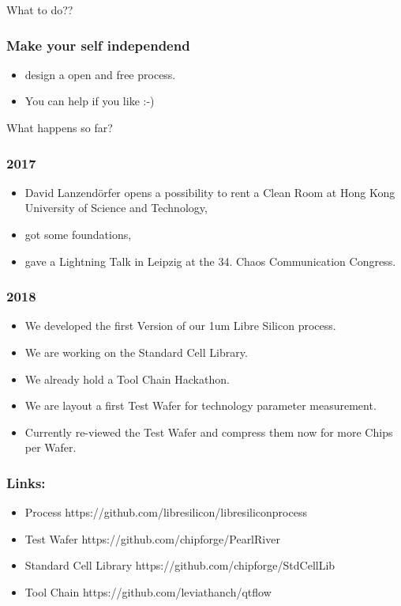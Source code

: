 \documentclass{beamer}
\begin{document}
\begin{frame}
What to do??
\end{frame}

\begin{frame}
\frametitle{Make your self independend}
\begin{itemize}
\item design a open and free process.
\item You can help if you like :-)
\end{itemize}
\end{frame}

\begin{frame}
What happens so far?
\end{frame}

\begin{frame}
\frametitle{2017}
\begin{itemize}
\item David Lanzendörfer opens a possibility to rent a Clean Room at Hong Kong University of Science and Technology,
\item got some foundations,
\item gave a Lightning Talk in Leipzig at the 34. Chaos Communication Congress.
\end{itemize}
\end{frame}


\begin{frame}
\frametitle{2018}
\begin{itemize}
\item We developed the first Version of our 1um Libre Silicon process.
\item We are working on the Standard Cell Library.
\item We already hold a Tool Chain Hackathon.
\item We are layout a first Test Wafer for technology parameter measurement.
\item Currently re-viewed the Test Wafer and compress them now for more Chips per Wafer.
\end{itemize}
\end{frame}

\begin{frame}
\frametitle{Links:}
\begin{itemize}
\item Process
https://github.com/libresilicon/libresiliconprocess
\item Test Wafer
https://github.com/chipforge/PearlRiver
\item Standard Cell Library
https://github.com/chipforge/StdCellLib
\item Tool Chain
https://github.com/leviathanch/qtflow
\end{itemize}
\end{frame}
\end{document}
